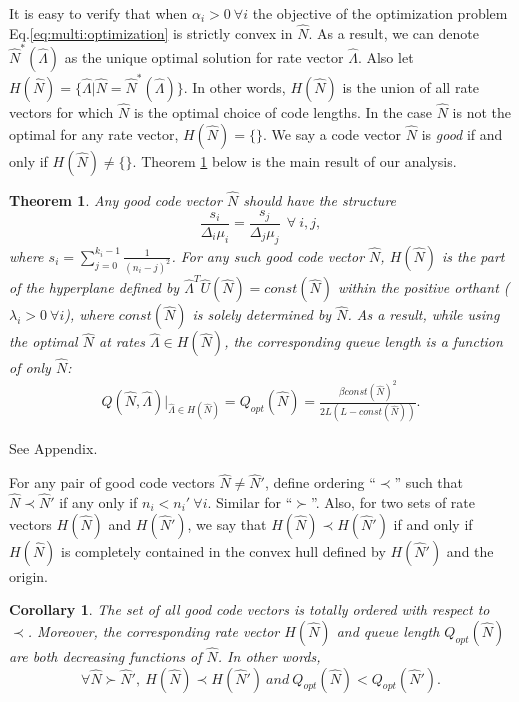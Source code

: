 \documentclass[journal]{IEEEtran}
\newcommand{\rateVec}{\hat{\Lambda}}
\newcommand{\codeVec}{\hat{N}}
\newcommand{\usageVec}{\hat{U}}
\newtheorem{theorem}{\textbf{Theorem}}
\newtheorem{corollary}{\textbf{Corollary}}
\begin{document}
It is easy to verify that when $\alpha_i>0~\forall i$ the objective of the optimization problem Eq.\ref{eq:multi:optimization} is strictly convex in $\codeVec$.
As a result, we can denote $\codeVec^*(\rateVec)$ as the unique optimal solution for rate vector $\rateVec$. Also let $H(\codeVec) = \{\rateVec|\codeVec = \codeVec^*(\rateVec)\}$. In other words, $H(\codeVec)$ is the union of all rate vectors for which $\codeVec$ is the optimal choice of code lengths. In the case $\codeVec$ is not the optimal for any rate vector, $H(\codeVec)=\{\}$. We say a code vector $\codeVec$ is {\em good} if and only if $H(\codeVec)\neq \{\}$. Theorem \ref{thm:optimal} below is the main result of our analysis.


\begin{theorem}
\label{thm:optimal}
Any good code vector  $\codeVec$ should have the structure
\begin{equation}
\frac{s_i}{\Delta_i\mu_i}= \frac{s_j}{\Delta_j\mu_j}~~ \forall~i,j,
\label{eq:opt:structure}
\end{equation}
where $s_i = \sum_{j=0}^{k_i-1} \frac{1}{(n_i-j)^2}$.
For any such good code vector $\codeVec$, $H(\codeVec)$ is the part of the hyperplane defined by  $\rateVec^T \usageVec(\codeVec) = const(\codeVec)$ within the positive orthant ($\lambda_i>0~\forall i$), where $const(\codeVec)$ is solely determined by $\codeVec$. As a result, while using the optimal  $\codeVec$ at rates $\rateVec\in H(\codeVec)$, the corresponding queue length is a function of only $\codeVec$:
\begin{align*}
Q(\codeVec,\rateVec)|_{\rateVec\in H(\codeVec)} = Q_{opt}(\codeVec)
= \frac{\beta const(\codeVec)^2}{2L(L-const(\codeVec))}.
\end{align*}
\end{theorem}



\begin{IEEEproof} See Appendix.
\end{IEEEproof}


For any pair of good code vectors $\codeVec\neq \codeVec'$, define ordering ``$\prec$'' such that $\codeVec \prec \codeVec'$ if any only if $n_i < n_i'~\forall i$. Similar for ``$\succ$''. 
Also, for two sets of rate vectors $H(\codeVec)$ and $H(\codeVec')$, we say that $H(\codeVec)\prec H(\codeVec')$ if and only if $H(\codeVec)$ is completely contained in the convex hull defined by $H(\codeVec')$ and the origin.



\begin{corollary}
\label{thm:ordered}
The set of all good code vectors is totally ordered with respect to $\prec$.  Moreover, 
 the corresponding rate vector $H(\codeVec)$ and queue length $Q_{opt}(\codeVec)$ are both decreasing functions of $\codeVec$. In other words, 
\begin{equation}
\forall \codeVec \succ \codeVec',~
H(\codeVec)\prec H(\codeVec')~and 
~Q_{opt}(\codeVec)<Q_{opt}(\codeVec').\nonumber
\end{equation}
\end{corollary}
\end{document}
